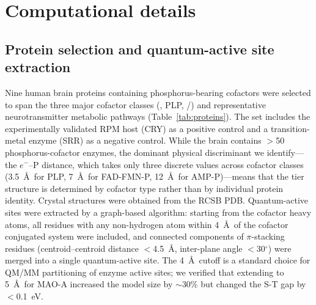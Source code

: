 \documentclass[twoside,twocolumn,9pt]{article}
\begin{document}
\section{Computational details}

\subsection{Protein selection and quantum-active site extraction}

Nine human brain proteins containing phosphorus-bearing cofactors were selected to span the three major cofactor classes (, PLP, /) and representative neurotransmitter metabolic pathways (Table~\ref{tab:proteins}). The set includes the experimentally validated RPM host (CRY) as a positive control and a transition-metal enzyme (SRR) as a negative control. While the brain contains $>$50 phosphorus-cofactor enzymes, the dominant physical discriminant we identify---the $e^-$--P distance, which takes only three discrete values across cofactor classes (3.5~\AA\ for PLP, 7~\AA\ for FAD-FMN-P, 12~\AA\ for AMP-P)---means that the tier structure is determined by cofactor type rather than by individual protein identity. Crystal structures were obtained from the RCSB PDB. Quantum-active sites were extracted by a graph-based algorithm: starting from the cofactor heavy atoms, all residues with any non-hydrogen atom within 4~\AA\ of the cofactor conjugated system were included, and connected components of $\pi$-stacking residues (centroid--centroid distance $<$4.5~\AA, inter-plane angle $<$30$^{\circ}$) were merged into a single quantum-active site. The 4~\AA\ cutoff is a standard choice for QM/MM partitioning of enzyme active sites;\cite{Vianello2012} we verified that extending to 5~\AA\ for MAO-A increased the model size by $\sim$30\% but changed the S-T gap by $<$0.1~eV.
\end{document}
